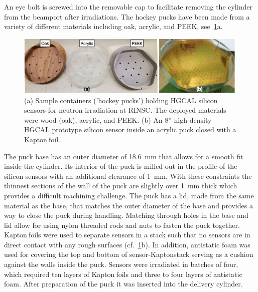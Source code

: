 An eye bolt is screwed into the removable cap to facilitate removing the cylinder from the beamport after irradiations.\newline
The hockey pucks have been made from a variety of different materials including oak, acrylic, and PEEK, see~\ref{fig:Pucks_Arrayed}a. 
\begin{figure}[!hbt]
  \begin{center}
    \includegraphics[width=0.99\textwidth]{figures/figures_edited_002.jpeg}
    \caption{(a) Sample containers ('hockey pucks') holding HGCAL silicon sensors for neutron irradiation at RINSC. 
    The deployed materials were wood (oak), acrylic, and PEEK.
    (b) An 8'' high-density HGCAL prototype silicon sensor inside an acrylic puck closed with a Kapton\texttrademark$~$foil.}
    \label{fig:Pucks_Arrayed}
  \end{center}
\end{figure}
The puck base has an outer diameter of \SI{18.6}{\milli\metre} that allows for a smooth fit inside the cylinder. 
Its interior of the puck is milled out in the profile of the silicon sensors with an additional clearance of \SI{1}{\milli\metre}. 
With these constraints the thinnest sections of the wall of the puck are slightly over \SI{1}{\milli\metre} thick which provides a difficult machining challenge.
The puck has a lid, made from the same material as the base, that matches the outer diameter of the base and provides a way to close the puck during handling.
Matching through holes in the base and lid allow for using nylon threaded rods and nuts to fasten the puck together. \newline
Kapton\texttrademark$~$foils were used to separate sensors in a stack such that no sensors are in direct contact with any rough surfaces (cf.~\ref{fig:Pucks_Arrayed}b).
In addition, antistatic foam was used for covering the top and bottom of sensor-Kapton\texttrademark stack serving as a cushion  against the walls inside the puck.
Sensors were irradiated in batches of four, which required ten layers of Kapton\texttrademark$~$foils and three to four layers of antistatic foam. 
After preparation of the puck it was inserted into the delivery cylinder.
